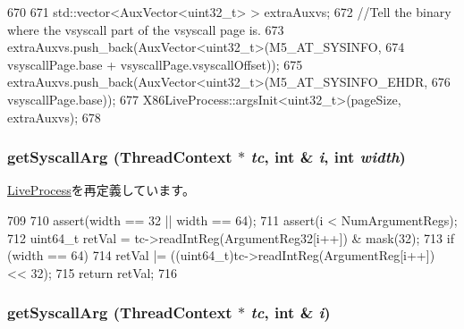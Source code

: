 \begin{DoxyCode}
670 {
671     std::vector<AuxVector<uint32_t> > extraAuxvs;
672     //Tell the binary where the vsyscall part of the vsyscall page is.
673     extraAuxvs.push_back(AuxVector<uint32_t>(M5_AT_SYSINFO,
674                 vsyscallPage.base + vsyscallPage.vsyscallOffset));
675     extraAuxvs.push_back(AuxVector<uint32_t>(M5_AT_SYSINFO_EHDR,
676                 vsyscallPage.base));
677     X86LiveProcess::argsInit<uint32_t>(pageSize, extraAuxvs);
678 }
\end{DoxyCode}
\hypertarget{classX86ISA_1_1I386LiveProcess_afe872a4ad58edd7774a108ac2ff35d60}{
\subsubsection[{getSyscallArg}]{ getSyscallArg ({\bf ThreadContext} $\ast$ {\em tc}, \/  int \& {\em i}, \/  int {\em width})}}
\label{classX86ISA_1_1I386LiveProcess_afe872a4ad58edd7774a108ac2ff35d60}


\hyperlink{classLiveProcess_a383f46521b8667b58a1275f2a3e2fda1}{LiveProcess}を再定義しています。


\begin{DoxyCode}
709 {
710     assert(width == 32 || width == 64);
711     assert(i < NumArgumentRegs);
712     uint64_t retVal = tc->readIntReg(ArgumentReg32[i++]) & mask(32);
713     if (width == 64)
714         retVal |= ((uint64_t)tc->readIntReg(ArgumentReg[i++]) << 32);
715     return retVal;
716 }
\end{DoxyCode}
\hypertarget{classX86ISA_1_1I386LiveProcess_a6f33c62983b3e68106d1cdb43b9fc09c}{
\subsubsection[{getSyscallArg}]{ getSyscallArg ({\bf ThreadContext} $\ast$ {\em tc}, \/  int \& {\em i})}}
\label{classX86ISA_1_1I386LiveProcess_a6f33c62983b3e68106d1cdb43b9fc09c}


